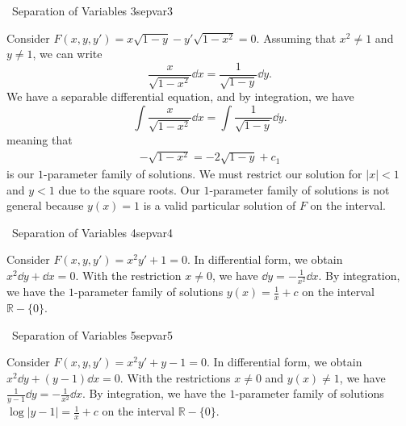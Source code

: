     \pagebreak
    \begin{example}{\Difficulty\,\Difficulty\,\,Separation of Variables 3}{sepvar3}

        Consider \(F(x,y,y')=x\sqrt{1-y}-y'\sqrt{1-x^2}=0\). Assuming that \(x^2\neq 1\) and \(y\neq 1\), we can write
        \begin{equation*}
            \frac{x}{\sqrt{1-x^2}}\dd x=\frac{1}{\sqrt{1-y}}\dd y.
        \end{equation*}
        We have a separable differential equation, and by integration, we have
        \begin{equation*}
            \int \frac{x}{\sqrt{1-x^2}}\dd x=\int \frac{1}{\sqrt{1-y}}\dd y.
        \end{equation*}
        meaning that
        \begin{align*}
            -\sqrt{1-x^2}=-2\sqrt{1-y}+c_1
        \end{align*}
        is our \(1\)-parameter family of solutions. We must restrict our solution for \(|x|<1\) and \(y<1\) due to the square roots. Our \(1\)-parameter family of solutions is not general because \(y(x)=1\) is a valid particular solution of \(F\) on the interval.
        
    \end{example}
    \begin{example}{\Difficulty\,\Difficulty\,\,Separation of Variables 4}{sepvar4}

        Consider \(F(x,y,y')=x^2y'+1=0\). In differential form, we obtain \(x^2\dd y+\dd x=0\). With the restriction \(x\neq0\), we have \(\dd y=-\frac{1}{x^2}\dd x\). By integration, we have the \(1\)-parameter family of solutions \(y(x)= \frac{1}{x}+c\) on the interval \(\mathbb{R}-\{0\}\). 

    \end{example}
    \begin{example}{\Difficulty\,\Difficulty\,\,Separation of Variables 5}{sepvar5}

        Consider \(F(x,y,y')=x^2y'+y-1=0\). In differential form, we obtain \(x^2\dd y+(y-1)\dd x=0\). With the restrictions \(x\neq0\) and \(y(x)\neq 1\), we have \(\frac{1}{y-1}\dd y=-\frac{1}{x^2}\dd x\). By integration, we have the \(1\)-parameter family of solutions \(\log|y-1|=\frac{1}{x}+c\) on the interval \(\mathbb{R}-\{0\}\).

    \end{example}
    

    \pagebreak

